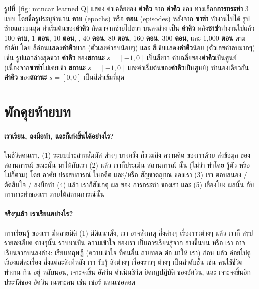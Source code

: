 รูปที่~\ref{fig: mtncar learned Q} แสดง ค่าเฉลี่ยของ \textbf{ค่าคิว} จาก \textbf{ค่าคิว} ของ ทางเลือก\textbf{การกระทำ} 3 แบบ
โดยชื่อรูประบุจำนวน \textbf{คาบ} (epochs) หรือ \textbf{ตอน} (episodes) หลังจาก \textbf{ซาซ่า} ทำงานไปได้
รูปซ้ายแถวบนสุด ค่าเริ่มต้นของ\textbf{ค่าคิว} ถัดมาจากซ้ายไปขวา-บนลงล่าง เป็น \textbf{ค่าคิว} หลัง\textbf{ซาซ่า}ทำงานไปแล้ว 100 \textbf{คาบ}, 1 \textbf{ตอน}, 10 \textbf{ตอน}, , 40 \textbf{ตอน}, 80 \textbf{ตอน}, 160 \textbf{ตอน}, 300 \textbf{ตอน}, และ 1,000 \textbf{ตอน} ตามลำดับ
โดย สีอ่อนแสดง\textbf{ค่าคิว}มาก (ตัวเลขค่าลบน้อยๆ) และ สีเข้มแสดง\textbf{ค่าคิว}น้อย (ตัวเลขค่าลบมากๆ)
เช่น รูปแถวล่างสุดขวา \textbf{ค่าคิว} ของ\textbf{สถานะ} $s = [-1, 0]$ เป็นสีขาว ค่าเฉลี่ยของ\textbf{ค่าคิว}เป็นศูนย์ (เนื่องจาก\textbf{ซาซ่า}ไม่เคยเข้า \textbf{สถานะ} $s = [-1, 0]$ และค่าเริ่มต้นของ\textbf{ค่าคิว}เป็นศูนย์)
ทำนองเดียวกัน \textbf{ค่าคิว} ของ\textbf{สถานะ} $s = [0, 0]$ เป็นสีดำเข้มที่สุด


\section{พักคุยท้ายบท}
\paragraph{เราเรียน, ลงมือทำ, และก็เก่งขึ้นได้อย่างไร?}

ในชีวิตคนเรา, (1) ระบบประสาทสัมผัส ต่างๆ บางครั้ง ก็รวมถึง ความคิด ของเราด้วย ส่งข้อมูล ของ สถานการณ์ ขณะนั้น มาให้กับเรา
%
(2) แล้ว เราก็ประเมิน สถานการณ์ นั้น (ไม่ว่า ทำโดย รู้ตัว หรือ ไม่ก็ตาม) โดย อาศัย ประสบการณ์ ในอดีต และ/หรือ สัญชาตญาณ ของเรา
%
(3) เรา ตอบสนอง / ตัดสินใจ / ลงมือทำ 
%
(4) แล้ว เราก็สังเกตุ ผล ของ การกระทำ ของเรา
และ (5) เชื่องโยง ผลนั้น กับ การกระทำของเรา ภายใต้สถานการณ์นั้น

\paragraph{จริงๆแล้ว เราเรียนอย่างไร?}
การเรียนรู้ ของเรา มีหลายมิติ
(1) มิติแนวตั้ง, เรา อาจสังเกตุ สิ่งต่างๆ เรื่องราวต่างๆ แล้ว เราก็ สรุป รายละเอียด ต่างๆนั้น รวบมาเป็น ความเข้าใจ ของเรา
เป็นการเรียนรู้จาก ล่างขึ้นบน
%
หรือ เรา อาจเรียนจากบนลงล่าง: เรียนทฤษฎี (ความเข้าใจ ที่คนอื่น ถ่ายทอด ต่อ มาให้ เรา) ก่อน แล้ว ค่อยไปดู เรื่องแต่ละเรื่อง สิ่งแต่ละสิ่งทีหลัง
%
เรา รับรู้ สิ่งต่างๆ เรื่องราวๆ ต่างๆ เป็นลำดับชั้น เช่น คนใช้ชีวิต ทำงาน กิน อยู่ หลับนอน, เจาะจงขึ้น อัศวิน ดำเนินชีวิต ยึดกฎปฎิบัติ ของอัศวิน, และ เจาะจงขึ้นอีก ประวัติของ อัศวิน เฉพาะคน เช่น เซอร์ แลนเซอลอต

